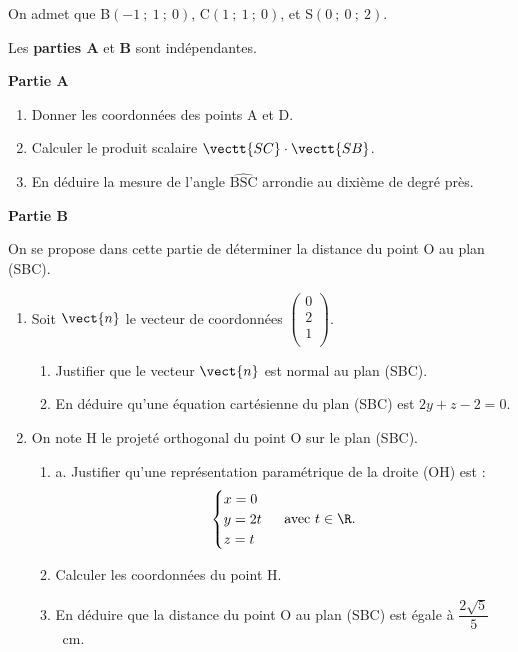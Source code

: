 On admet que B$(-1~;~1~;~0)$, C$(1~;~1~;~0)$, et S$(0~;~0~;~2)$.

\medskip

Les \textbf{parties A} et \textbf{B} sont indépendantes.

\textbf{Partie A}

\begin{enumerate}
\item Donner les coordonnées des points A et D.
\item Calculer le produit scalaire $\vectt{SC}\cdot\vectt{SB}$.
\item En déduire la mesure de l'angle $\widehat{\mathrm{BSC}}$ arrondie au dixième de degré près.
\end{enumerate}

\textbf{Partie B}

On se propose dans cette partie de déterminer la distance du point O au plan (SBC).

\begin{enumerate}
\item Soit $\vect{n}$ le vecteur de coordonnées $\begin{pmatrix} 0\\ 2\\ 1\\ \end{pmatrix}$.
	\begin{enumerate}
		\item Justifier que le vecteur $\vect{n}$ est normal au plan (SBC).
		\item En déduire qu'une équation cartésienne du plan (SBC) est \quad $2 y+z-2=0$.
	\end{enumerate}
	\item On note H le projeté orthogonal du point O sur le plan (SBC).
		\begin{enumerate}
			\item a. Justifier qu'une représentation paramétrique de la droite (OH) est :
			\[\begin{cases}
			x =0\\
			y =2t\\
			z =t\\
			\end{cases}\text{ avec } t \in \R.\]
			\item Calculer les coordonnées du point H.
			\item En déduire que la distance du point O au plan (SBC) est égale à $\dfrac{2 \sqrt{5}}{5}$~cm.
		\end{enumerate}
	\end{enumerate}

